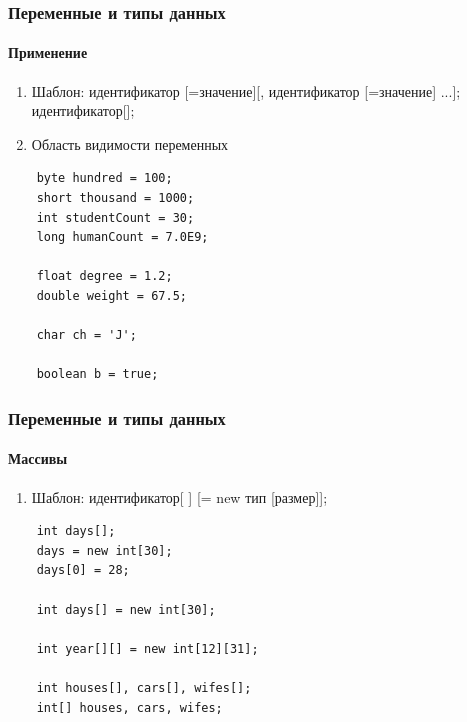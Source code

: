 \documentclass[10pt,pdf,hyperref={unicode}]{beamer}
\begin{document}


\begin{frame}[fragile]
\frametitle{Переменные и типы данных}
\framesubtitle{Применение}
\begin{enumerate}
  \item Шаблон:
     идентификатор [=значение][, идентификатор [=значение] ...];
     идентификатор[];
  \item Область видимости переменных
\end{enumerate}
\begin{lstlisting}
    byte hundred = 100;
    short thousand = 1000;
    int studentCount = 30;
    long humanCount = 7.0E9;

    float degree = 1.2;
    double weight = 67.5;

    char ch = 'J';

    boolean b = true;
\end{lstlisting}
\end{frame}

\begin{frame}[fragile]
\frametitle{Переменные и типы данных}
\framesubtitle{Массивы}
\begin{enumerate}
  \item Шаблон:
     идентификатор[ ] [= new тип [размер]];
\end{enumerate}
\begin{lstlisting}
    int days[];
    days = new int[30];
    days[0] = 28;

    int days[] = new int[30];

    int year[][] = new int[12][31];

    int houses[], cars[], wifes[];
    int[] houses, cars, wifes;
\end{lstlisting}
\end{frame}
\end{document}

